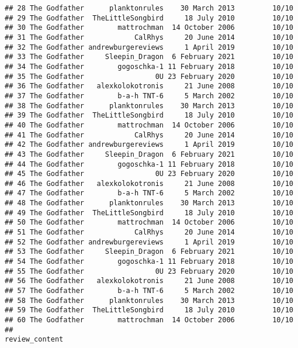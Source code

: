 \documentclass[
]{article}
\begin{document}
\begin{verbatim}
## 28 The Godfather      planktonrules    30 March 2013         10/10
## 29 The Godfather  TheLittleSongbird     18 July 2010         10/10
## 30 The Godfather        mattrochman  14 October 2006         10/10
## 31 The Godfather            CalRhys     20 June 2014         10/10
## 32 The Godfather andrewburgereviews     1 April 2019         10/10
## 33 The Godfather     Sleepin_Dragon  6 February 2021         10/10
## 34 The Godfather        gogoschka-1 11 February 2018         10/10
## 35 The Godfather                 0U 23 February 2020         10/10
## 36 The Godfather   alexkolokotronis     21 June 2008         10/10
## 37 The Godfather        b-a-h TNT-6     5 March 2002         10/10
## 38 The Godfather      planktonrules    30 March 2013         10/10
## 39 The Godfather  TheLittleSongbird     18 July 2010         10/10
## 40 The Godfather        mattrochman  14 October 2006         10/10
## 41 The Godfather            CalRhys     20 June 2014         10/10
## 42 The Godfather andrewburgereviews     1 April 2019         10/10
## 43 The Godfather     Sleepin_Dragon  6 February 2021         10/10
## 44 The Godfather        gogoschka-1 11 February 2018         10/10
## 45 The Godfather                 0U 23 February 2020         10/10
## 46 The Godfather   alexkolokotronis     21 June 2008         10/10
## 47 The Godfather        b-a-h TNT-6     5 March 2002         10/10
## 48 The Godfather      planktonrules    30 March 2013         10/10
## 49 The Godfather  TheLittleSongbird     18 July 2010         10/10
## 50 The Godfather        mattrochman  14 October 2006         10/10
## 51 The Godfather            CalRhys     20 June 2014         10/10
## 52 The Godfather andrewburgereviews     1 April 2019         10/10
## 53 The Godfather     Sleepin_Dragon  6 February 2021         10/10
## 54 The Godfather        gogoschka-1 11 February 2018         10/10
## 55 The Godfather                 0U 23 February 2020         10/10
## 56 The Godfather   alexkolokotronis     21 June 2008         10/10
## 57 The Godfather        b-a-h TNT-6     5 March 2002         10/10
## 58 The Godfather      planktonrules    30 March 2013         10/10
## 59 The Godfather  TheLittleSongbird     18 July 2010         10/10
## 60 The Godfather        mattrochman  14 October 2006         10/10
##                                                                                                                                                                                                                                                                                                                                                                                                                                                                                                          review_content

\end{verbatim}
\end{document}
